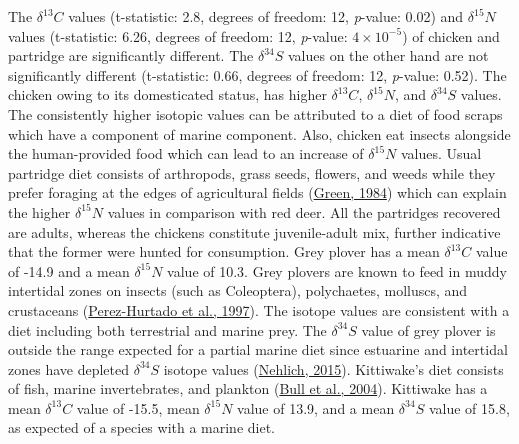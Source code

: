 \documentclass[preprint, 3p, authoryear]{elsarticle} %
\begin{document}
The \(\delta ^{13}C\) values (t-statistic: 2.8, degrees of freedom: 12, \emph{p}-value: 0.02) and \(\delta ^{15}N\) values (t-statistic: 6.26, degrees of freedom: 12, \emph{p}-value: \ensuremath{4\times 10^{-5}}) of chicken and partridge are significantly different. The \(\delta ^{34}S\) values on the other hand are not significantly different (t-statistic: 0.66, degrees of freedom: 12, \emph{p}-value: 0.52). The chicken owing to its domesticated status, has higher \(\delta ^{13}C\), \(\delta ^{15}N\), and \(\delta ^{34}S\) values. The consistently higher isotopic values can be attributed to a diet of food scraps which have a component of marine component. Also, chicken eat insects alongside the human-provided food which can lead to an increase of \(\delta ^{15}N\) values. Usual partridge diet consists of arthropods, grass seeds, flowers, and weeds while they prefer foraging at the edges of agricultural fields (\protect\hyperlink{ref-green84}{Green, 1984}) which can explain the higher \(\delta ^{15}N\) values in comparison with red deer. All the partridges recovered are adults, whereas the chickens constitute juvenile-adult mix, further indicative that the former were hunted for consumption.
Grey plover has a mean \(\delta ^{13}C\) value of -14.9\text{\textperthousand} and a mean \(\delta ^{15}N\) value of 10.3\text{\textperthousand}. Grey plovers are known to feed in muddy intertidal zones on insects (such as Coleoptera), polychaetes, molluscs, and crustaceans (\protect\hyperlink{ref-perez-hurtado_etal97}{Perez-Hurtado et al., 1997}). The isotope values are consistent with a diet including both terrestrial and marine prey. The \(\delta ^{34}S\) value of grey plover is outside the range expected for a partial marine diet since estuarine and intertidal zones have depleted \(\delta ^{34}S\) isotope values (\protect\hyperlink{ref-nehlich15}{Nehlich, 2015}). Kittiwake's diet consists of fish, marine invertebrates, and plankton (\protect\hyperlink{ref-bull_etal04}{Bull et al., 2004}). Kittiwake has a mean \(\delta ^{13}C\) value of -15.5\text{\textperthousand}, mean \(\delta ^{15}N\) value of 13.9\text{\textperthousand}, and a mean \(\delta ^{34}S\) value of 15.8\text{\textperthousand}, as expected of a species with a marine diet.
\end{document}

